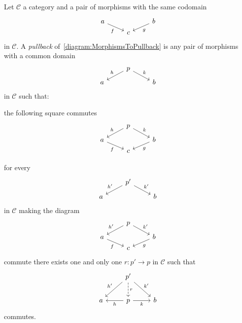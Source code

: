 \begin{definition}
  Let \(\mathcal{C}\) a category and a pair of morphisms with the same codomain
  \begin{equation}
    \begin{tikzcd}[row sep=tiny]
      a \ar["f", dr, swap] &   & b \ar["g", dl] \\
      & c &
    \end{tikzcd}
    \label{diagram:MorphismsToPullback}
  \end{equation}
  in \(\mathcal{C}\). A {\em pullback} of~\eqref{diagram:MorphismsToPullback} is
  any pair of morphisms with a common domain
  \[
    \begin{tikzcd}[row sep=tiny]
      & p \ar["h", dl, swap] \ar["k", dr] &   \\
      a & & b
    \end{tikzcd}
  \]
  in \(\mathcal{C}\) such that:
  \begin{tcbitem}
  \item the following square commutes
    \[
      \begin{tikzcd}[row sep=tiny]
        & p \ar["h", dl, swap] \ar["k", dr] &   \\
        a \ar["f", dr, swap] &   & b \ar["g", dl] \\
        & c &
      \end{tikzcd}
    \]
  \item for every
    \[
      \begin{tikzcd}[row sep=tiny]
        & p' \ar["{h'}", dl, swap] \ar["{k'}", dr] &   \\
        a & & b
      \end{tikzcd}
    \]
    in \(\mathcal{C}\) making the diagram
    \[
      \begin{tikzcd}[row sep=tiny]
        & p \ar["{h'}", dl, swap] \ar["{k'}", dr] &   \\
        a \ar["f", dr, swap] &   & b \ar["g", dl] \\
        & c &
      \end{tikzcd}
    \]
    commute there exists one and only one \(r : p' \to p\) in
    \(\mathcal{C}\) such that
    \[
      \begin{tikzcd}
        & p' \ar["{h'}", dl, swap] \ar["r", d, dashed] \ar["{k'}", dr] & \\
        a & p \ar["h", l] \ar["k", r, swap] & b
      \end{tikzcd}
    \]
    commutes.
  \end{tcbitem}

\end{definition}
